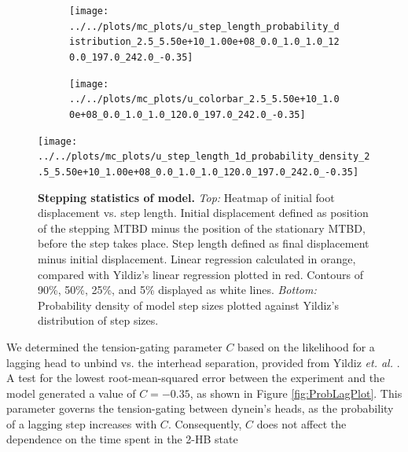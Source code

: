 \documentclass[9pt,twocolumn,twoside]{article}
\begin{document}


\begin{figure}[tbhp]
\centering
\begin{subfigure}{.75\columnwidth}
	\centering
	\texttt{[image: ../../plots/mc\_plots/u\_step\_length\_probability\_distribution\_2.5\_5.50e+10\_1.00e+08\_0.0\_1.0\_1.0\_120.0\_197.0\_242.0\_-0.35]}
\end{subfigure}
\begin{subfigure}{.2\columnwidth}
	\centering
	\texttt{[image: ../../plots/mc\_plots/u\_colorbar\_2.5\_5.50e+10\_1.00e+08\_0.0\_1.0\_1.0\_120.0\_197.0\_242.0\_-0.35]}
\end{subfigure}
\texttt{[image: ../../plots/mc\_plots/u\_step\_length\_1d\_probability\_density\_2.5\_5.50e+10\_1.00e+08\_0.0\_1.0\_1.0\_120.0\_197.0\_242.0\_-0.35]}
\caption[Stepping statistics of model]{\textbf{Stepping statistics of model.} \textit{Top: } Heatmap of initial foot displacement vs. step length. Initial displacement defined as position of the stepping MTBD minus the position of the stationary MTBD, before the step takes place. Step length defined as final displacement minus initial displacement. Linear regression calculated in orange, compared with Yildiz's linear regression plotted in red. Contours of 90\%, 50\%, 25\%, and 5\% displayed as white lines. \textit{Bottom: } Probability density of model step sizes plotted against Yildiz's distribution of step sizes. }
\label{fig:SteppingPlots}
\end{figure}



%
We determined the tension-gating parameter $C$ based on the likelihood for a lagging head to unbind vs. the interhead separation, provided from Yildiz \textit{et. al.} \cite{yildizpaper}. A test for the lowest root-mean-squared error between the experiment and the model generated a value of $C=-0.35$, as shown in Figure \ref{fig:ProbLagPlot}. This parameter governs the tension-gating between dynein's heads, as the probability of a lagging step increases with $C$. Consequently, $C$ does not affect the dependence on the time spent in the 2-HB state 
\end{document}
